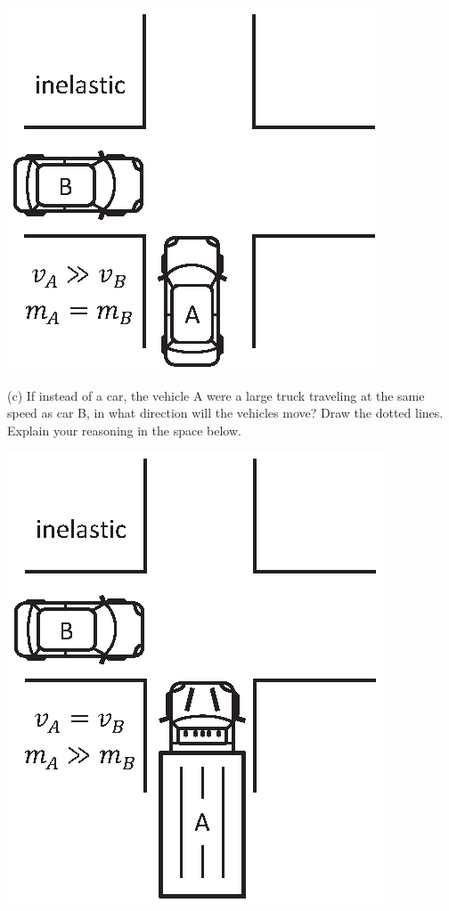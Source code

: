 \hspace{0.3in}
\includegraphics{twod_collisions/two_cars_unequal_speeds.eps}

(c) If instead of a car, the vehicle A were a large truck traveling at the same
speed as car B, in what direction will the vehicles move? Draw the dotted lines.
Explain your reasoning in the space below.

\hspace{0.3in}
\includegraphics{twod_collisions/car_and_truck.eps}

